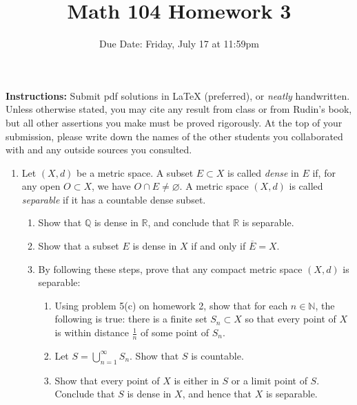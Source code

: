 \documentclass[12pt, letterpaper]{article}
\title{Math 104 Homework 3}
\author{Due Date: Friday, July 17 at 11:59pm}
\date{}
\newcommand{\0}{\mathbf{0}}
\newcommand{\1}{\mathbf{1}}
\begin{document}
\maketitle

\textbf{Instructions:} Submit pdf solutions in LaTeX (preferred), or \textit{neatly} handwritten. Unless otherwise stated, you may cite any result from class or from Rudin's book, but all other assertions you make must be proved rigorously. At the top of your submission, please write down the names of the other students you collaborated with and any outside sources you consulted.

\vspace{0.5cm}

\begin{enumerate}
    \item 
    Let $(X, d)$ be a metric space. A subset $E \subset X$ is called \textit{dense} in $E$ if, for any open $O \subset X$, we have $O \cap E \neq \varnothing$. A metric space $(X, d)$ is called \textit{separable} if it has a countable dense subset.
    \begin{enumerate}
        \item 
        Show that $\mathbb{Q}$ is dense in $\mathbb{R}$, and conclude that $\mathbb{R}$ is separable.

        \item
        Show that a subset $E$ is dense in $X$ if and only if $\overline{E} = X$.

        \item 
        By following these steps, prove that any compact metric space $(X, d)$ is separable:
        \begin{enumerate}
            \item 
            Using problem 5(c) on homework 2, show that for each $n \in \mathbb{N}$, the following is true: there is a finite set $S_n \subset X$ so that every point of $X$ is within distance $\frac{1}{n}$ of some point of $S_n$.

            \item 
            Let $S = \bigcup\limits_{n = 1}^{\infty} S_n$. Show that $S$ is countable.

            \item 
            Show that every point of $X$ is either in $S$ or a limit point of $S$. Conclude that $S$ is dense in $X$, and hence that $X$ is separable.
            
        \end{enumerate}
        

\end{enumerate}
\end{enumerate}
\end{document}

